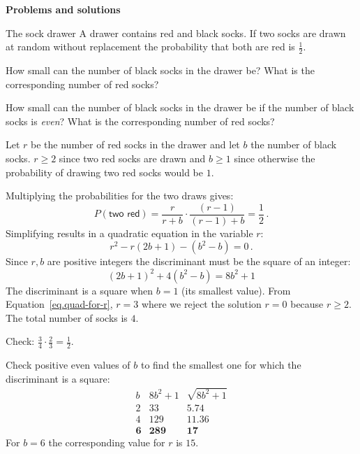 

\begin{center}
\textbf{\LARGE Problems and solutions}
\end{center}


\begin{prob}{The sock drawer}
A drawer contains red and black socks. If two socks are drawn at random without replacement the probability that both are red is $\frac{1}{2}$. 

 How small can the number of black socks in the drawer be? What is the corresponding number of red socks?

 How small can the number of black socks in the drawer be if the number of black socks is \emph{even}? What is the corresponding number of red socks?
\end{prob}


 Let $r$ be the number of red socks in the drawer and let $b$ the number of black socks.  $r\geq 2$ since two red socks are drawn and $b\geq 1$ since otherwise the probability of drawing two red socks would be $1$.

Multiplying the probabilities for the two draws gives:
\begin{equation}\label{eq.1-a}
P(\textsf{two red})=\frac{r}{r+b} \cdot \frac{(r-1)}{(r-1)+b} = \frac{1}{2}\,.
\end{equation}
Simplifying results in a quadratic equation in the variable $r$:
\begin{equation}\label{eq.quad-for-r}
r^2-r(2b+1)-(b^2-b)=0\,.
\end{equation}
Since $r,b$ are positive integers the discriminant must be the square of an integer:
\begin{equation}\label{eq.discriminant}
(2b+1)^2+4(b^2-b)=8b^2+1
\end{equation}
The discriminant is a square when $b=1$ (its smallest value). From Equation~\ref{eq.quad-for-r}, $r=3$ where we reject the solution $r=0$ because $r\geq 2$. The total number of socks is $4$.

Check: $\frac{3}{4}\cdot\frac{2}{3}=\frac{1}{2}$.

\medskip

Check positive even values of $b$ to find the smallest one for which the discriminant is a square:
\begin{displaymath}
\renewcommand{\arraystretch}{1}
\begin{array}{r|r|r}
b&8b^2+1&\sqrt{8b^2+1}\\
\hline
2&33&5.74\\
4&129&11.36\\
\mathbf{6}&\mathbf{289}&\mathbf{17}
\end{array}
\end{displaymath}
For $b=6$ the corresponding value for $r$ is $15$.

